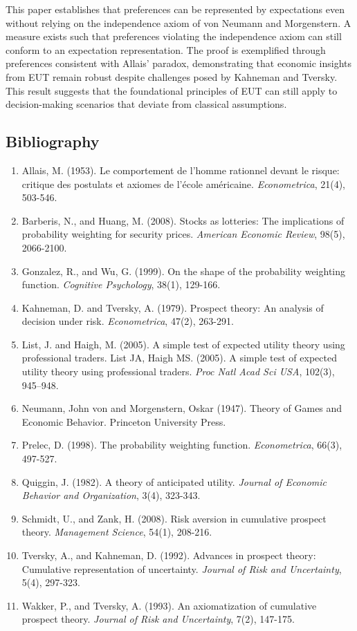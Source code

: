 \documentclass{article}
\begin{document}
This paper establishes that preferences can be represented by expectations even without relying on the independence axiom of von Neumann and Morgenstern. A measure exists such that preferences violating the independence axiom can still conform to an expectation representation. The proof is exemplified through preferences consistent with Allais' paradox, demonstrating that economic insights from EUT remain robust despite challenges posed by Kahneman and Tversky. This result suggests that the foundational principles of EUT can still apply to decision-making scenarios that deviate from classical assumptions.
	
\subsection*{Bibliography}
\begin{enumerate}
    \item Allais, M. (1953). Le comportement de l'homme rationnel devant le risque: critique des postulats et axiomes de l'école américaine. \textit{Econometrica}, 21(4), 503-546.
    \item Barberis, N., and Huang, M. (2008). Stocks as lotteries: The implications of probability weighting for security prices. \textit{American Economic Review}, 98(5), 2066-2100.
    \item Gonzalez, R., and Wu, G. (1999). On the shape of the probability weighting function. \textit{Cognitive Psychology}, 38(1), 129-166.
    \item Kahneman, D. and Tversky, A. (1979). Prospect theory: An analysis of decision under risk. \textit{Econometrica}, 47(2), 263-291.
    \item List, J. and Haigh, M. (2005).  A simple test of expected utility theory using professional traders.  List JA, Haigh MS. (2005). A simple test of expected utility theory using professional traders. \textit{Proc Natl Acad Sci USA}, 102(3), 945–948.
    \item Neumann, John von and Morgenstern, Oskar (1947). Theory of Games and Economic Behavior. Princeton University Press.
    \item Prelec, D. (1998). The probability weighting function. \textit{Econometrica}, 66(3), 497-527.
    \item Quiggin, J. (1982). A theory of anticipated utility. \textit{Journal of Economic Behavior and Organization}, 3(4), 323-343.
    \item Schmidt, U., and Zank, H. (2008). Risk aversion in cumulative prospect theory. \textit{Management Science}, 54(1), 208-216.
    \item Tversky, A., and Kahneman, D. (1992). Advances in prospect theory: Cumulative representation of uncertainty. \textit{Journal of Risk and Uncertainty}, 5(4), 297-323.
    \item Wakker, P., and Tversky, A. (1993). An axiomatization of cumulative prospect theory. \textit{Journal of Risk and Uncertainty}, 7(2), 147-175.
    
\end{enumerate}
	
\end{document}
